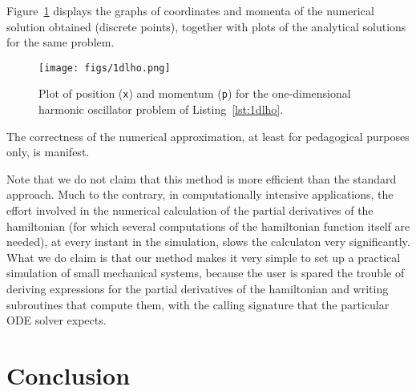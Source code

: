 \documentclass{iopart}
\begin{document}
Figure~\ref{fig:1dlho}
displays the graphs of coordinates and momenta of the numerical solution
obtained (discrete points), together with plots of the analytical solutions for
the same problem.
\begin{figure}[htb]
  \begin{center}
    \texttt{[image: figs/1dlho.png]}
  \end{center}
  \caption{Plot of position (\texttt{x}) and momentum (\texttt{p}) for the
  one-dimensional harmonic oscillator problem of Listing~\ref{lst:1dlho}.
  }\label{fig:1dlho}
\end{figure}
The correctness of the numerical approximation, at least for pedagogical
purposes only, is manifest.

Note that we do not claim that this method is more efficient than the standard
approach. Much to the contrary, in computationally intensive applications, the
effort involved in the numerical calculation of the partial derivatives of the
hamiltonian (for which several computations of the hamiltonian function itself
are needed), at every instant in the simulation, slows the calculaton very
significantly. What we do claim is that our method makes it very simple to set
up a practical simulation of small mechanical systems, because the user is
spared the trouble of deriving expressions for the partial derivatives of the
hamiltonian and writing subroutines that compute them, with the calling
signature that the particular ODE solver expects.


\section{Conclusion}
\end{document}
